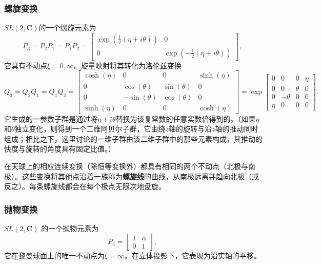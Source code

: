 \subsubsection{螺旋变换}
$SL(2,\mathbf{C})$的一个螺旋元素为
\[
P_{3} = P_{2}P_{1} = P_{1}P_{2} =
\begin{bmatrix}
\exp\!\left(\tfrac{1}{2}(\eta + i\theta)\right) & 0 \\
0 & \exp\!\left(-\tfrac{1}{2}(\eta + i\theta)\right)
\end{bmatrix},~
\]
它具有不动点$\xi = 0, \infty$。旋量映射将其转化为洛伦兹变换
\[
Q_{3} = Q_{2}Q_{1} = Q_{1}Q_{2} =
\begin{bmatrix}
\cosh(\eta) & 0 & 0 & \sinh(\eta) \\
0 & \cos(\theta) & \sin(\theta) & 0 \\
0 & -\sin(\theta) & \cos(\theta) & 0 \\
\sinh(\eta) & 0 & 0 & \cosh(\eta)
\end{bmatrix}
=
\exp\!\begin{bmatrix}
0 & 0 & 0 & \eta \\
0 & 0 & \theta & 0 \\
0 & -\theta & 0 & 0 \\
\eta & 0 & 0 & 0
\end{bmatrix}.~
\]
它生成的一参数子群是通过将$\eta + i\theta$替换为该复常数的任意实数倍得到的。（如果$\eta$和$\theta$独立变化，则得到一个二维阿贝尔子群，它由绕$z$轴的旋转与沿$z$轴的推动同时组成；相比之下，这里讨论的一维子群由该二维子群中的那些元素构成，其推动的快度与旋转的角度具有固定比值。）

在天球上的相应连续变换（除恒等变换外）都具有相同的两个不动点（北极与南极）。这些变换将其他点沿着一族称为\textbf{螺旋线}的曲线，从南极远离并趋向北极（或反之）。每条螺旋线都会在每个极点无限次地盘旋。
\subsubsection{抛物变换}
$SL(2,\mathbf{C})$ 的一个抛物元素为
\[
P_{4} =
\begin{bmatrix}
1 & \alpha \\
0 & 1
\end{bmatrix},~
\]
它在黎曼球面上的唯一不动点为$\xi = \infty$。在立体投影下，它表现为沿实轴的平移。

